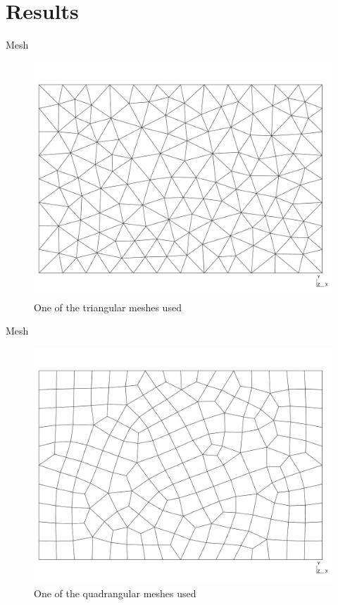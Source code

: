 \documentclass[11pt]{beamer}
\begin{document}
\section{Results}
\begin{frame}{Mesh}
\begin{figure}
	\centering
	\includegraphics[scale=0.25]{meshtri}
	\caption{One of the triangular meshes used}
\end{figure}
\end{frame}
\begin{frame}{Mesh}
\begin{figure}
	\centering
	\includegraphics[scale=0.25]{meshquad}
	\caption{One of the quadrangular meshes used}
\end{figure}
\end{frame}
\end{document}
